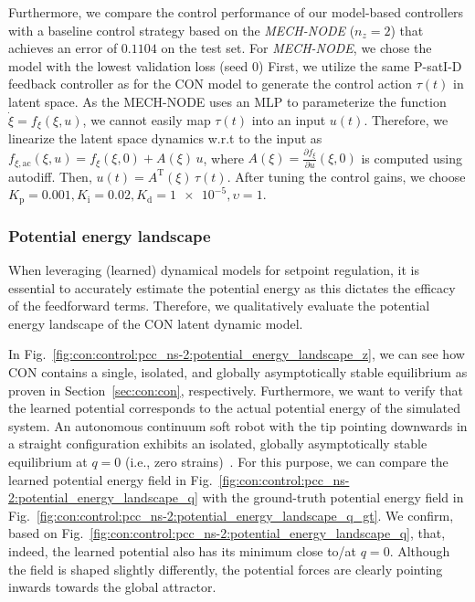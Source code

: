 Furthermore, we compare the control performance of our model-based controllers with a baseline control strategy based on the \emph{MECH-NODE} ($n_z = 2$) that achieves an error of $0.1104$ on the test set.
For \emph{MECH-NODE}, we chose the model with the lowest validation loss (seed $0$)
First, we utilize the same P-satI-D feedback controller as for the \gls{CON} model to generate the control action $\tau(t)$ in latent space. 
As the MECH-NODE uses an \gls{MLP} to parameterize the function $\dot{\xi} = f_\xi(\xi, u)$, we cannot easily map $\tau(t)$ into an input $u(t)$. 
Therefore, we linearize the latent space dynamics w.r.t to the input as $f_{\xi,\mathrm{ac}}(\xi, u) = f_\xi(\xi, 0) + A(\xi) \, u$, where $A(\xi) = \frac{\partial f_\xi}{\partial u}(\xi, 0)$ is computed using autodiff. Then, $u(t) = A^\mathrm{T}(\xi) \, \tau(t)$. After tuning the control gains, we choose  $K_\mathrm{p} = 0.001, K_\mathrm{i}=0.02, K_\mathrm{d} = \num{1e-5}, \upsilon = 1$.

\subsubsection{Potential energy landscape}
When leveraging (learned) dynamical models for setpoint regulation, it is essential to accurately estimate the potential energy as this dictates the efficacy of the feedforward terms. Therefore, we qualitatively evaluate the potential energy landscape of the \gls{CON} latent dynamic model.

In Fig.~\ref{fig:con:control:pcc_ns-2:potential_energy_landscape_z}, we can see how \gls{CON} contains a single, isolated, and globally asymptotically stable equilibrium as proven in Section~\ref{sec:con:con}, respectively. 
% 
Furthermore, we want to verify that the learned potential corresponds to the actual potential energy of the simulated system.
An autonomous continuum soft robot with the tip pointing downwards in a straight configuration exhibits an isolated, globally asymptotically stable equilibrium at $q = 0$ (i.e., zero strains)~\citep{stolzle2021piston}.
For this purpose, we can compare the learned potential energy field in Fig.~\ref{fig:con:control:pcc_ns-2:potential_energy_landscape_q} with the ground-truth potential energy field in Fig.~\ref{fig:con:control:pcc_ns-2:potential_energy_landscape_q_gt}.
We confirm, based on Fig.~\ref{fig:con:control:pcc_ns-2:potential_energy_landscape_q}, that, indeed, the learned potential also has its minimum close to/at $q=0$. Although the field is shaped slightly differently, the potential forces are clearly pointing inwards towards the global attractor.

